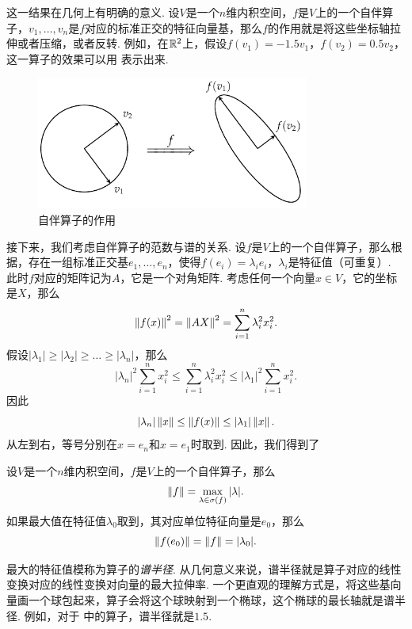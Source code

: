 这一结果在几何上有明确的意义. 设$V$是一个$n$维内积空间，$f$是$V$上的一个自伴算子，$v_1,\dots,v_n$是$f$对应的标准正交的特征向量基，那么$f$的作用就是将这些坐标轴拉伸或者压缩，或者反转. 例如，在$\mathbb{R}^2$上，假设$f(v_1)=-1.5v_1$，$f(v_2)=0.5v_2$，这一算子的效果可以用 表示出来. 

\begin{figure}[ht]
\centering
\includegraphics[width=0.8\textwidth]{figures/linear-algebra/self-adjoint.pdf}
\caption{自伴算子的作用}
\label{fig:symmetric-operator}
\end{figure}

接下来，我们考虑自伴算子的范数与谱的关系. 设$f$是$V$上的一个自伴算子，那么根据，存在一组标准正交基$e_1,\dots,e_n$，使得$f(e_i)=\lambda_i e_i$，$\lambda_i$是特征值（可重复）. 此时$f$对应的矩阵记为$A$，它是一个对角矩阵. 考虑任何一个向量$x\in V$，它的坐标是$X$，那么
\[
    \left\|f(x)\right\|^2=\left\|AX\right\|^2=\sum_{i=1}^n\lambda_i^2x_i^2.
\]
假设$|\lambda_1|\geq|\lambda_2|\geq\dots\geq|\lambda_n|$，那么
\[
    |\lambda_n|^2\sum_{i=1}^n x_i^2\leq \sum_{i=1}^n\lambda_i^2x_i^2\leq |\lambda_1|^2\sum_{i=1}^n x_i^2.
\]
因此
\[
    |\lambda_n|\left\|x\right\|\leq \left\|f(x)\right\|\leq |\lambda_1|\left\|x\right\|.
\]
从左到右，等号分别在$x=e_n$和$x=e_1$时取到. 因此，我们得到了

\begin{theorem}\label{thm:symmetric-operator-norm}
    设$V$是一个$n$维内积空间，$f$是$V$上的一个自伴算子，那么
    \[\left\|f\right\|=\max_{\lambda\in\sigma(f)}|\lambda|.\]
    如果最大值在特征值$\lambda_0$取到，其对应单位特征向量是$e_0$，那么
    \[\left\|f(e_0)\right\|=\left\|f\right\|=|\lambda_0|.\]
\end{theorem}

最大的特征值模称为算子的\textit{谱半径}. 从几何意义来说，谱半径就是算子对应的线性变换对应的线性变换对向量的最大拉伸率. 一个更直观的理解方式是，将这些基向量画一个球包起来，算子会将这个球映射到一个椭球，这个椭球的最长轴就是谱半径. 例如，对于 中的算子，谱半径就是$1.5$. 
